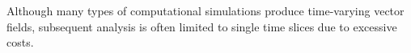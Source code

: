 %
Although many types of computational simulations produce time-varying vector fields, 
subsequent analysis is often limited to single time slices due to excessive costs.
